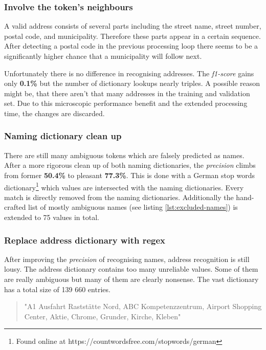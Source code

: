 \subsubsection{Involve the token's neighbours}

A valid address consists of several parts including the street name, street number, postal code, and municipality. Therefore these parts appear in a certain
sequence. After detecting a postal code in the previous processing loop there seems to be a significantly higher chance that a municipality will follow next.

Unfortunately there is no difference in recognising addresses. The \emph{f1-score} gains only \textbf{0.1\%} but the number of dictionary lookups nearly triples.
A possible reason might be, that there aren't that many addresses in the training and validation set. Due to this microscopic performance benefit and the extended
processing time, the changes are discarded.

\subsubsection{Naming dictionary clean up}

There are still many ambiguous tokens which are falsely predicted as names. After a more rigorous clean up of both naming dictionaries, the \emph{precision} climbs
from former \textbf{50.4\%} to pleasant \textbf{77.3\%}. This is done with a German stop words dictionary\footnote{Found online at
https://countwordsfree.com/stopwords/german} which values are intersected with the naming dictionaries. Every match is directly removed from the naming dictionaries.
Additionally the hand-crafted list of mostly ambiguous names (see listing \ref{lst:excluded-names}) is extended to 75 values in total.

\subsubsection{Replace address dictionary with regex}

After improving the \emph{precision} of recognising names, address recognition is still lousy. The address dictionary contains too many unreliable values. Some of
them are really ambiguous but many of them are clearly nonsense. The vast dictionary has a total size of 139 660 entries.

\begin{quote}
    "A1 Ausfahrt Raststätte Nord, ABC Kompetenzzentrum, Airport Shopping Center, Aktie, Chrome, Grunder, Kirche, Kleben"
\end{quote}

